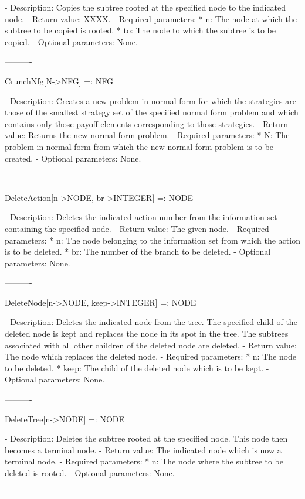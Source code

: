    -	Description:  Copies the subtree rooted at the specified node to the 
	indicated node.
   -	Return value:  XXXX.
   -	Required parameters:
	  *  n:  The node at which the subtree to be copied is rooted.
	  *  to:  The node to which the subtree is to be copied.
   -	Optional parameters:  None.

----------

CrunchNfg[N->NFG] =: NFG

   -	Description:  Creates a new problem in normal form for which the 
	strategies are those of the smallest strategy set of the specified 
	normal form problem and which contains only those payoff elements
	corresponding to those strategies.
   -	Return value:  Returns the new normal form problem.
   -	Required parameters:
	  *  N:  The problem in normal form from which the new normal form 
		problem is to be created.
   -	Optional parameters:  None.

----------

DeleteAction[n->NODE, br->INTEGER] =: NODE

   -	Description:  Deletes the indicated action number from the information
	set containing the specified node.
   -	Return value:  The given node.
   -	Required parameters:
	  *  n:  The node belonging to the information set from which the 
		action is to be deleted.
	  *  br:  The number of the branch to be deleted.
   -	Optional parameters:  None.

----------

DeleteNode[n->NODE, keep->INTEGER] =: NODE

   -	Description:  Deletes the indicated node from the tree.  The specified
	child of the deleted node is kept and replaces the node in its spot in
	the tree.  The subtrees associated with all other children of the 
	deleted node are deleted.
   -	Return value:  The node which replaces the deleted node.
   -	Required parameters:
	  *  n:  The node to be deleted.
	  *  keep:  The child of the deleted node which is to be kept.
   -	Optional parameters:  None.

----------

DeleteTree[n->NODE] =: NODE

   -	Description:  Deletes the subtree rooted at the specified node.  This 
	node then becomes a terminal node.
   -	Return value:  The indicated node which is now a terminal node.
   -	Required parameters:
	  *  n:  The node where the subtree to be deleted is rooted.
   -	Optional parameters:  None.

----------

